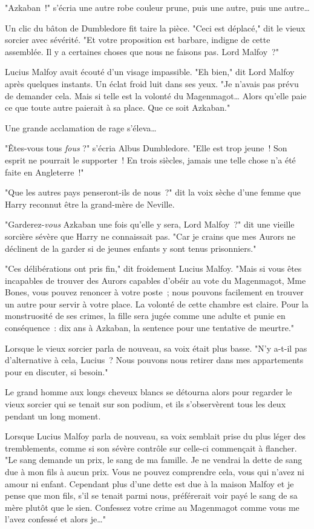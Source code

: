 "Azkaban~!" s'écria une autre robe couleur prune, puis une autre, puis une autre…

Un clic du bâton de Dumbledore fit taire la pièce. "Ceci est déplacé," dit le vieux sorcier avec sévérité. "Et votre proposition est barbare, indigne de cette assemblée. Il y a certaines choses que nous ne faisons pas. Lord Malfoy~?"

Lucius Malfoy avait écouté d'un visage impassible. "Eh bien," dit Lord Malfoy après quelques instants. Un éclat froid luit dans ses yeux. "Je n'avais pas prévu de demander cela. Mais si telle est la volonté du Magenmagot… Alors qu'elle paie ce que toute autre paierait à sa place. Que ce soit Azkaban."

Une grande acclamation de rage s'éleva…

"Êtes-vous tous \emph{fous} ?" s'écria Albus Dumbledore. "Elle est trop jeune~! Son esprit ne pourrait le supporter~! En trois siècles, jamais une telle chose n'a été faite en Angleterre~!"

"Que les autres pays penseront-ils de nous~?" dit la voix sèche d'une femme que Harry reconnut être la grand-mère de Neville.

"Garderez-\emph{vous} Azkaban une fois qu'elle y sera, Lord Malfoy~?" dit une vieille sorcière sévère que Harry ne connaissait pas. "Car je crains que mes Aurors ne déclinent de la garder si de jeunes enfants y sont tenus prisonniers."

"Ces délibérations ont pris fin," dit froidement Lucius Malfoy. "Mais si vous êtes incapables de trouver des Aurors capables d'obéir au vote du Magenmagot, Mme Bones, vous pouvez renoncer à votre poste~; nous pouvons facilement en trouver un autre pour servir à votre place. La volonté de cette chambre est claire. Pour la monstruosité de ses crimes, la fille sera jugée comme une adulte et punie en conséquence~: dix ans à Azkaban, la sentence pour une tentative de meurtre."

Lorsque le vieux sorcier parla de nouveau, sa voix était plus basse. "N'y a-t-il pas d'alternative à cela, Lucius~? Nous pouvons nous retirer dans mes appartements pour en discuter, si besoin."

Le grand homme aux longs cheveux blancs se détourna alors pour regarder le vieux sorcier qui se tenait sur son podium, et ils s'observèrent tous les deux pendant un long moment.

Lorsque Lucius Malfoy parla de nouveau, sa voix semblait prise du plus léger des tremblements, comme si son sévère contrôle sur celle-ci commençait à flancher. "Le sang demande un prix, le sang de ma famille. Je ne vendrai la dette de sang due à mon fils à aucun prix. Vous ne pouvez comprendre cela, vous qui n'avez ni amour ni enfant. Cependant plus d'une dette est due à la maison Malfoy et je pense que mon fils, s'il se tenait parmi nous, préférerait voir payé le sang de sa mère plutôt que le sien. Confessez votre crime au Magenmagot comme vous me l'avez confessé et alors je…"

